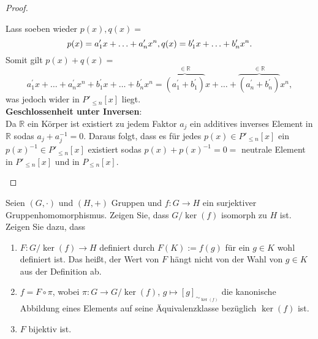 \documentclass{../problemset}
\begin{document}
\begin{problem}
\begin{proof}
\begin{enumerate}
		      Lass soeben wieder $p(x), q(x) =$ \[
			      p(x) = a^\prime_1x + \ldots + a^\prime_nx^n, \\
			      q(x) = b^\prime_1x + \ldots + b^\prime_nx^n.
		      \]
		      Somit gilt $p(x) + q(x) =$ \[
			      a^\prime_1x + \ldots + a^\prime_nx^n + b^\prime_1x + \ldots + b^\prime_nx^n =
			      \overbrace{(a^\prime_1+b^\prime_1)}^{\in \mathbb{R}}x + \ldots + \overbrace{(a^\prime_n+b^\prime_n)}^{\in \mathbb{R}}x^n,
		      \] was jedoch wider in $P'_{\le n}[x]$ liegt.
		      \checkmark
		      \\
		      \textbf{Geschlossenheit unter Inversen}: \\
		      Da $\mathbb{R}$ ein Körper ist existiert zu jedem Faktor $a_j$ ein additives inverses Element in $\mathbb{R}$ sodas $a_j + a_j^{-1} = 0$.
		      Daraus folgt, dass es für jedes $p(x) \in P'_{\le n}[x]$ ein $p(x)^{-1} \in P'_{\le n}[x]$ existiert sodas $p(x) + p(x)^{-1} = 0 =$ neutrale Element in $P'_{\le n}[x]$ und in $P_{\le n}[x]$.
		      \checkmark
	\end{enumerate}


\end{proof}

\end{problem}

\begin{problem}
Seien $(G, \cdot)$ und $(H, +)$ Gruppen und $f: G \to H$ ein surjektiver Gruppenhomomorphismus. Zeigen Sie, dass $G/\ker(f)$ isomorph zu $H$ ist. Zeigen Sie dazu, dass
\begin{enumerate}
	\item $F: G/\ker(f) \to H$ definiert durch $F(K) := f(g)$ für ein $g \in K$ wohl definiert ist. Das heißt, der Wert von $F$ hängt nicht von der Wahl von $g \in K$ aus der Definition ab.
	\item $f = F \circ \pi$, wobei $\pi: G \to G/\ker(f)$, $g \mapsto [g]_{\sim_{\ker(f)}}$ die kanonische Abbildung eines Elements auf seine Äquivalenzklasse bezüglich $\ker(f)$ ist.
	\item $F$ bijektiv ist.
\end{enumerate}

\end{problem}
\end{document}
